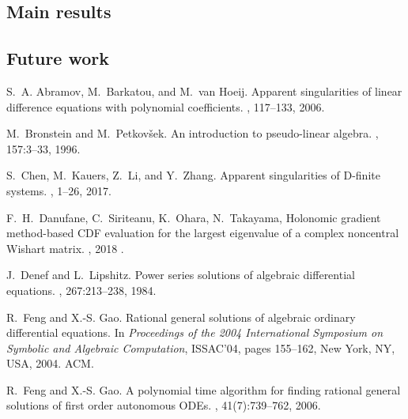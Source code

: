 \documentclass[10pt,a4paper]{article}
\begin{document}
\subsection{Main results}

\subsection{Future work}



% 
\begin{thebibliography}{10}

S.~A. Abramov, M.~Barkatou, and M.~van Hoeij.
\newblock Apparent singularities of linear difference equations with polynomial
  coefficients.
, 117--133, 2006.


M.~Bronstein and M.~Petkov{\v{s}}ek.
\newblock An introduction to pseudo-linear algebra.
, 157:3--33, 1996.
  
S.~Chen, M.~Kauers, Z.~Li, and Y.~Zhang.
\newblock Apparent singularities of {D}-finite systems.
, 1--26, 2017.
  
F.~H.~Danufane, C.~Siriteanu, K.~Ohara, N.~Takayama,
\newblock Holonomic gradient method-based CDF evaluation for the largest eigenvalue
of a complex noncentral Wishart matrix.
, 2018 .

J.~Denef and L.~Lipshitz.
\newblock Power series solutions of algebraic differential equations.
, 267:213--238, 1984.

R.~Feng and X.-S. Gao.
\newblock Rational general solutions of algebraic ordinary differential
  equations.
\newblock In {\em Proceedings of the 2004 International Symposium on Symbolic
  and Algebraic Computation}, ISSAC'04, pages 155--162, New York, NY, USA,
  2004. ACM.

R.~Feng and X.-S. Gao.
\newblock A polynomial time algorithm for finding rational general solutions of
  first order autonomous {ODEs}.
, 41(7):739--762, 2006.

% 
% 
% 


\end{thebibliography}
\end{document}
